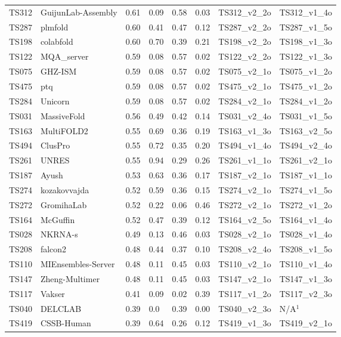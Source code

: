 \begin{table}[ht]
{\begin{tabular}{llllllll}
TS312 & GuijunLab-Assembly & 0.61 & 0.09 & 0.58 & 0.03 & TS312\_v2\_2o & TS312\_v1\_4o \\ 
TS287 & plmfold & 0.60 & 0.41 & 0.47 & 0.12 & TS287\_v2\_2o & TS287\_v1\_5o \\ 
TS198 & colabfold & 0.60 & 0.70 & 0.39 & 0.21 & TS198\_v2\_2o & TS198\_v1\_3o \\ 
TS122 & MQA\_server & 0.59 & 0.08 & 0.57 & 0.02 & TS122\_v2\_2o & TS122\_v1\_3o \\ 
TS075 & GHZ-ISM & 0.59 & 0.08 & 0.57 & 0.02 & TS075\_v2\_1o & TS075\_v1\_2o \\ 
TS475 & ptq & 0.59 & 0.08 & 0.57 & 0.02 & TS475\_v2\_1o & TS475\_v1\_2o \\ 
TS284 & Unicorn & 0.59 & 0.08 & 0.57 & 0.02 & TS284\_v2\_1o & TS284\_v1\_2o \\ 
TS031 & MassiveFold & 0.56 & 0.49 & 0.42 & 0.14 & TS031\_v2\_4o & TS031\_v1\_5o \\ 
TS163 & MultiFOLD2 & 0.55 & 0.69 & 0.36 & 0.19 & TS163\_v1\_3o & TS163\_v2\_5o \\ 
TS494 & ClusPro & 0.55 & 0.72 & 0.35 & 0.20 & TS494\_v1\_4o & TS494\_v2\_4o \\ 
TS261 & UNRES & 0.55 & 0.94 & 0.29 & 0.26 & TS261\_v1\_1o & TS261\_v2\_1o \\ 
TS187 & Ayush & 0.53 & 0.63 & 0.36 & 0.17 & TS187\_v2\_1o & TS187\_v1\_1o \\ 
TS274 & kozakovvajda & 0.52 & 0.59 & 0.36 & 0.15 & TS274\_v2\_1o & TS274\_v1\_5o \\ 
TS272 & GromihaLab & 0.52 & 0.22 & 0.06 & 0.46 & TS272\_v2\_1o & TS272\_v1\_2o \\ 
TS164 & McGuffin & 0.52 & 0.47 & 0.39 & 0.12 & TS164\_v2\_5o & TS164\_v1\_4o \\ 
TS028 & NKRNA-s & 0.49 & 0.13 & 0.46 & 0.03 & TS028\_v2\_1o & TS028\_v1\_4o \\ 
TS208 & falcon2 & 0.48 & 0.44 & 0.37 & 0.10 & TS208\_v2\_4o & TS208\_v1\_5o \\ 
TS110 & MIEnsembles-Server & 0.48 & 0.11 & 0.45 & 0.03 & TS110\_v2\_1o & TS110\_v1\_4o \\ 
TS147 & Zheng-Multimer & 0.48 & 0.11 & 0.45 & 0.03 & TS147\_v2\_1o & TS147\_v1\_3o \\ 
TS117 & Vakser & 0.41 & 0.09 & 0.02 & 0.39 & TS117\_v1\_2o & TS117\_v2\_3o \\ 
TS040 & DELCLAB & 0.39 & 0.0 & 0.39 & 0.00 & TS040\_v2\_3o & N/A$^{1}$ \\ 
TS419 & CSSB-Human & 0.39 & 0.64 & 0.26 & 0.12 & TS419\_v1\_3o & TS419\_v2\_1o \\ 

\end{tabular}}
\end{table}
